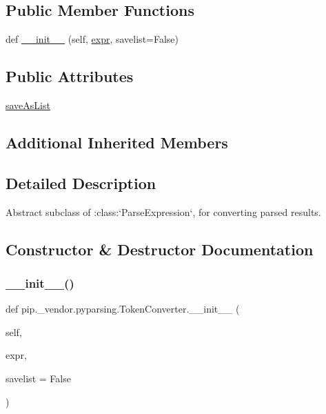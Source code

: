 \subsection*{Public Member Functions}
\begin{DoxyCompactItemize}
\item 
def \hyperlink{classpip_1_1__vendor_1_1pyparsing_1_1TokenConverter_a500bca188bbf34d4e589bd9127f89517}{\+\_\+\+\_\+init\+\_\+\+\_\+} (self, \hyperlink{classpip_1_1__vendor_1_1pyparsing_1_1ParseElementEnhance_af574b49a0a7d914693fdaa833df7098f}{expr}, savelist=False)
\end{DoxyCompactItemize}
\subsection*{Public Attributes}
\begin{DoxyCompactItemize}
\item 
\hyperlink{classpip_1_1__vendor_1_1pyparsing_1_1TokenConverter_af5c7b1af9bca9dd30fc24a780d1117c8}{save\+As\+List}
\end{DoxyCompactItemize}
\subsection*{Additional Inherited Members}


\subsection{Detailed Description}
\begin{DoxyVerb}Abstract subclass of :class:`ParseExpression`, for converting parsed results.
\end{DoxyVerb}
 

\subsection{Constructor \& Destructor Documentation}
\mbox{\label{classpip_1_1__vendor_1_1pyparsing_1_1TokenConverter_a500bca188bbf34d4e589bd9127f89517}} 
\subsubsection{\texorpdfstring{\+\_\+\+\_\+init\+\_\+\+\_\+()}{\_\_init\_\_()}}
{\footnotesize\ttfamily def pip.\+\_\+vendor.\+pyparsing.\+Token\+Converter.\+\_\+\+\_\+init\+\_\+\+\_\+ (\begin{DoxyParamCaption}\item[{}]{self,  }\item[{}]{expr,  }\item[{}]{savelist = {\ttfamily False} }\end{DoxyParamCaption})}



